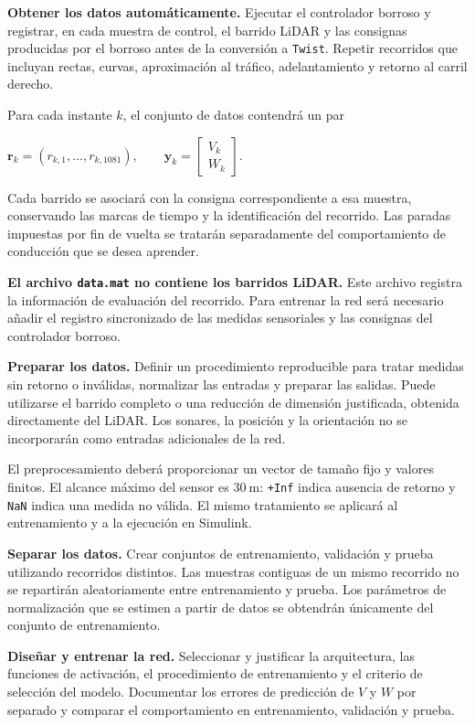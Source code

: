 \documentclass[11pt,a4paper]{article}
\newcommand{\romanitem}[2]{%
  \par\vspace{2mm}%
  \noindent\hangindent=8mm\hangafter=1%
  \makebox[8mm][r]{\textbf{#1.}\hspace{1.5mm}}#2\par
}
\newcommand{\centerEq}[1]{%
  \begin{center}$#1$\end{center}
}
\begin{document}
\romanitem{i}{\textbf{Obtener los datos automáticamente.}
Ejecutar el controlador borroso y registrar, en cada muestra de control,
el barrido LiDAR y las consignas producidas por el borroso antes de la
conversión a \texttt{Twist}. Repetir recorridos que incluyan rectas,
curvas, aproximación al tráfico, adelantamiento y retorno al carril derecho.}

Para cada instante $k$, el conjunto de datos contendrá un par
\centerEq{\mathbf r_k=(r_{k,1},\ldots,r_{k,1081}),
  \qquad
  \mathbf y_k=
  \begin{bmatrix}V_k\\W_k\end{bmatrix}.}
Cada barrido se asociará con la consigna correspondiente a esa muestra,
conservando las marcas de tiempo y la identificación del recorrido.
Las paradas impuestas por fin de vuelta se tratarán separadamente del
comportamiento de conducción que se desea aprender.

\textbf{El archivo \texttt{data.mat} no contiene los barridos LiDAR.}
Este archivo registra la información de evaluación del recorrido.
Para entrenar la red será necesario añadir el registro sincronizado de
las medidas sensoriales y las consignas del controlador borroso.

\romanitem{ii}{\textbf{Preparar los datos.}
Definir un procedimiento reproducible para tratar medidas sin retorno
o inválidas, normalizar las entradas y preparar las salidas.
Puede utilizarse el barrido completo o una reducción de dimensión
justificada, obtenida directamente del LiDAR.
Los sonares, la posición y la orientación no se incorporarán como entradas
adicionales de la red.}

El preprocesamiento deberá proporcionar un vector de tamaño fijo y valores
finitos. El alcance máximo del sensor es $30\ \mathrm{m}$:
\texttt{+Inf} indica ausencia de retorno y \texttt{NaN} indica una
medida no válida. El mismo tratamiento se aplicará al entrenamiento
y a la ejecución en Simulink.

\romanitem{iii}{\textbf{Separar los datos.}
Crear conjuntos de entrenamiento, validación y prueba utilizando
recorridos distintos. Las muestras contiguas de un mismo recorrido
no se repartirán aleatoriamente entre entrenamiento y prueba.
Los parámetros de normalización que se estimen a partir de datos
se obtendrán únicamente del conjunto de entrenamiento.}

\romanitem{iv}{\textbf{Diseñar y entrenar la red.}
Seleccionar y justificar la arquitectura, las funciones de activación,
el procedimiento de entrenamiento y el criterio de selección del modelo.
Documentar los errores de predicción de $V$ y $W$ por separado y
comparar el comportamiento en entrenamiento, validación y prueba.}
\end{document}
